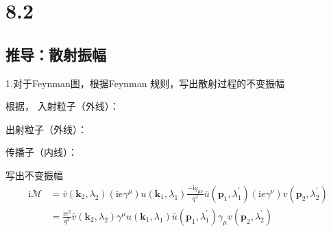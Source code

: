 \section{8.2}

\subsection{推导：散射振幅}


1.对于Feynman图，根据Feynman 规则，写出散射过程的不变振幅

根据，
入射粒子（外线）：

出射粒子（外线）：

传播子（内线）：

写出不变振幅
\begin{equation}
    \begin{aligned}
        \mathrm{i}\mathcal{M} &=\bar{v}(\mathbf{k}_2,\lambda _2)\left( \mathrm{i}e\gamma ^{\mu} \right) u(\mathbf{k}_1,\lambda _1)\frac{-\mathrm{i}g_{\mu \nu}}{q^2}\bar{u}(\mathbf{p}_1,\lambda _{1}^{\prime})\left( \mathrm{i}e\gamma ^{\nu} \right) v(\mathbf{p}_2,\lambda _{2}^{\prime})
\\
&=\frac{\mathrm{i}e^2}{q^2}\bar{v}(\mathbf{k}_2,\lambda _2)\gamma ^{\mu}u(\mathbf{k}_1,\lambda _1)\bar{u}(\mathbf{p}_1,\lambda _{1}^{\prime})\gamma _{\mu}v(\mathbf{p}_2,\lambda _{2}^{\prime})
    \end{aligned}
\end{equation}


